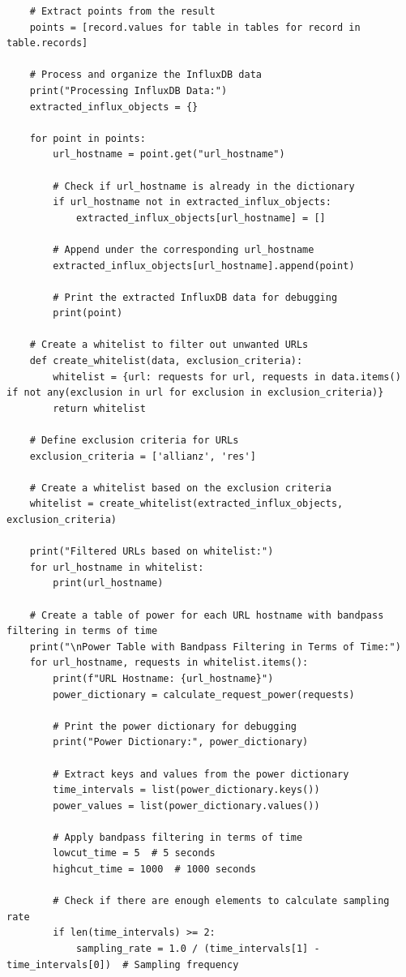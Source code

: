 \begin{lstlisting}
    # Extract points from the result
    points = [record.values for table in tables for record in table.records]

    # Process and organize the InfluxDB data
    print("Processing InfluxDB Data:")
    extracted_influx_objects = {}

    for point in points:
        url_hostname = point.get("url_hostname")

        # Check if url_hostname is already in the dictionary
        if url_hostname not in extracted_influx_objects:
            extracted_influx_objects[url_hostname] = []

        # Append under the corresponding url_hostname
        extracted_influx_objects[url_hostname].append(point)

        # Print the extracted InfluxDB data for debugging
        print(point)

    # Create a whitelist to filter out unwanted URLs
    def create_whitelist(data, exclusion_criteria):
        whitelist = {url: requests for url, requests in data.items() if not any(exclusion in url for exclusion in exclusion_criteria)}
        return whitelist

    # Define exclusion criteria for URLs
    exclusion_criteria = ['allianz', 'res']

    # Create a whitelist based on the exclusion criteria
    whitelist = create_whitelist(extracted_influx_objects, exclusion_criteria)

    print("Filtered URLs based on whitelist:")
    for url_hostname in whitelist:
        print(url_hostname)

    # Create a table of power for each URL hostname with bandpass filtering in terms of time
    print("\nPower Table with Bandpass Filtering in Terms of Time:")
    for url_hostname, requests in whitelist.items():
        print(f"URL Hostname: {url_hostname}")
        power_dictionary = calculate_request_power(requests)

        # Print the power dictionary for debugging
        print("Power Dictionary:", power_dictionary)

        # Extract keys and values from the power dictionary
        time_intervals = list(power_dictionary.keys())
        power_values = list(power_dictionary.values())

        # Apply bandpass filtering in terms of time
        lowcut_time = 5  # 5 seconds
        highcut_time = 1000  # 1000 seconds

        # Check if there are enough elements to calculate sampling rate
        if len(time_intervals) >= 2:
            sampling_rate = 1.0 / (time_intervals[1] - time_intervals[0])  # Sampling frequency


\end{lstlisting}
